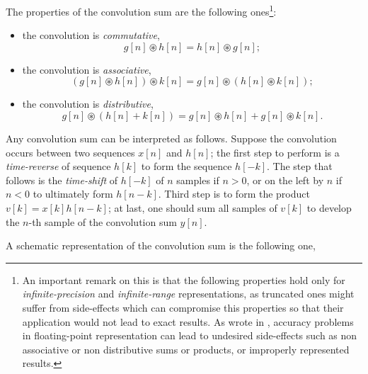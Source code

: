 \documentclass[\documentfontsize, twocolumn]{\classname}
\begin{document}
The properties of the convolution sum are the following ones\footnote{An important remark on this is that the following properties hold only for \emph{infinite-precision} and \emph{infinite-range} representations, as truncated ones might suffer from side-effects which can compromise this properties so that their application would not lead to exact results. As wrote in \cite{bib:floatingPointPrecisionIssues}, accuracy problems in floating-point representation can lead to undesired side-effects such as non associative or non distributive sums or products, or improperly represented results.}:
\begin{itemize}
    \item the convolution is \emph{commutative},\[ g[n] \circledast h[n] = h[n] \circledast g[n];\]
    \item the convolution is \emph{associative},\[ (g[n] \circledast h[n]) \circledast k[n] = g[n] \circledast (h[n] \circledast k[n]);\]
    \item the convolution is \emph{distributive},\[ g[n] \circledast (h[n] + k[n]) = g[n] \circledast h[n] + g[n] \circledast k[n].\]
\end{itemize}

Any convolution sum can be interpreted as follows. Suppose the convolution occurs between two sequences $x[n]$ and $h[n]$; the first step to perform is a \emph{time-reverse} of sequence $h[k]$ to form the sequence $h[-k]$. The step that follows is the \emph{time-shift} of $h[-k]$ of $n$ samples if $n > 0$, or on the left by $n$ if $n<0$ to ultimately form $h[n-k]$. Third step is to form the product $v[k] = x[k]h[n-k]$; at last, one should sum all samples of $v[k]$ to develop the $n$-th sample of the convolution sum $y[n]$.

A schematic representation of the convolution sum is the following one,
\begin{center}
\end{center}
\end{document}
